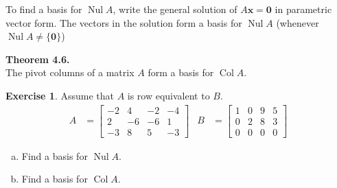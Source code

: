 \documentclass[10pt]{book}
\newcommand{\boxcolor}{gray!30}
\newenvironment{boxme}{\begin{mdframed}[backgroundcolor=\boxcolor,linewidth=0pt,nobreak=true]}{\end{mdframed}}
\newenvironment{boxthm}{\begin{mdframed}[backgroundcolor=\boxcolor,nobreak=true]}{\end{mdframed}}
\theoremstyle{definition}
\newtheorem{exercise}{Exercise}[section]
\newcommand{\vect}[1]{\ensuremath{\boldsymbol{\mathbf{#1}}}}
\DeclareMathOperator{\Nul}{Nul}
\DeclareMathOperator{\Col}{Col}
\newcommand{\Axz}{A\vect{x}=\vect{0}}
\begin{document}
\newpage

\begin{boxme}
	To find a basis for $\Nul A$, write the general solution of $\Axz$ in parametric vector form. The vectors in the solution form a basis for $\Nul A$ (whenever $\Nul A \neq \{\vect{0}\}$)
\end{boxme}
\begin{boxthm}
	\textbf{Theorem 4.6.} \\
	The pivot columns of a matrix $A$ form a basis for $\Col A$.
\end{boxthm}

\begin{exercise} %
	Assume that $A$ is row equivalent to $B$.
	\begin{align*}
	A &= \begin{bmatrix} -2&4&-2&-4 \\ 2&-6&-6&1 \\ -3&8&5&-3 \end{bmatrix} &
	B &= \begin{bmatrix} 1&0&9&5 \\ 0&2&8&3 \\ 0&0&0&0 \end{bmatrix}
	\end{align*}
	\begin{multicols}{2}
		\begin{enumerate}[(a)]
			\item Find a basis for $\Nul A$.
			\item Find a basis for $\Col A$.
		\end{enumerate}
	\end{multicols}
\end{exercise}
\vfill
\end{document}
